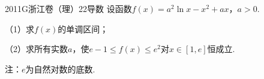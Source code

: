 
\begin{problem}{2011}{G}{浙江卷（理）}{22}{导数}
设函数$f(x)=a^2\ln x -x^2 +ax$，$a>0$.

（1）求$f(x)$的单调区间；

（2）求所有实数$a$，使$e-1 \leq f(x) \leq e^2$对$x\in[1,e]$恒成立.

注：$e$为自然对数的底数.
\end{problem}